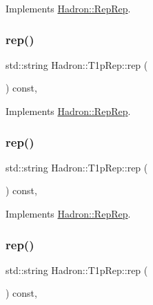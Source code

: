 Implements \mbox{\hyperlink{structHadron_1_1RepRep_ab3213025f6de249f7095892109575fde}{Hadron\+::\+Rep\+Rep}}.

\mbox{\label{structHadron_1_1T1pRep_a2cdc4017e6c5a92d190bc873e44361fe}} 
\subsubsection{\texorpdfstring{rep()}{rep()}\hspace{0.1cm}{\footnotesize\ttfamily [3/5]}}
{\footnotesize\ttfamily std\+::string Hadron\+::\+T1p\+Rep\+::rep (\begin{DoxyParamCaption}{ }\end{DoxyParamCaption}) const\hspace{0.3cm}{\ttfamily [inline]}, {\ttfamily [virtual]}}



Implements \mbox{\hyperlink{structHadron_1_1RepRep_ab3213025f6de249f7095892109575fde}{Hadron\+::\+Rep\+Rep}}.

\mbox{\label{structHadron_1_1T1pRep_a2cdc4017e6c5a92d190bc873e44361fe}} 
\subsubsection{\texorpdfstring{rep()}{rep()}\hspace{0.1cm}{\footnotesize\ttfamily [4/5]}}
{\footnotesize\ttfamily std\+::string Hadron\+::\+T1p\+Rep\+::rep (\begin{DoxyParamCaption}{ }\end{DoxyParamCaption}) const\hspace{0.3cm}{\ttfamily [inline]}, {\ttfamily [virtual]}}



Implements \mbox{\hyperlink{structHadron_1_1RepRep_ab3213025f6de249f7095892109575fde}{Hadron\+::\+Rep\+Rep}}.

\mbox{\label{structHadron_1_1T1pRep_a2cdc4017e6c5a92d190bc873e44361fe}} 
\subsubsection{\texorpdfstring{rep()}{rep()}\hspace{0.1cm}{\footnotesize\ttfamily [5/5]}}
{\footnotesize\ttfamily std\+::string Hadron\+::\+T1p\+Rep\+::rep (\begin{DoxyParamCaption}{ }\end{DoxyParamCaption}) const\hspace{0.3cm}{\ttfamily [inline]}, {\ttfamily [virtual]}}



